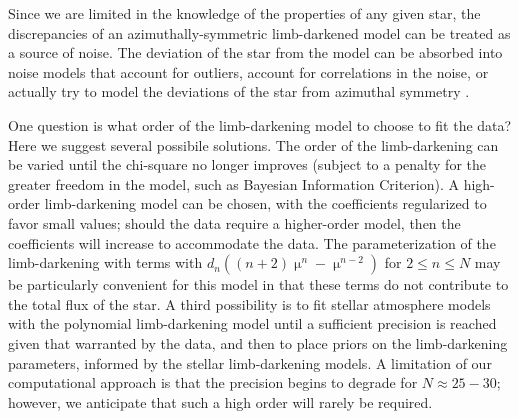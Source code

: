 \documentclass[modern]{aastex61}
\begin{document}
Since we are limited in the knowledge of the properties of any given star,
the discrepancies of an azimuthally-symmetric limb-darkened model can be
treated as a source of noise.
The deviation of the star from the model can be absorbed into noise models that
account for outliers, account for correlations in the noise, or actually
try to model the deviations of the star from azimuthal symmetry
\citep[e.g.][]{SanchisOjeda2011}.


One question is what order of the limb-darkening model to choose to
fit the data?  Here we suggest several possibile solutions.  The order of the
limb-darkening can be varied until the chi-square no longer improves (subject
to a penalty for the greater freedom in the model, such as Bayesian Information
Criterion).  A high-order limb-darkening model can be chosen, with the
coefficients regularized to favor small values;  should the data require
a higher-order model, then the coefficients will increase to accommodate
the data.  The parameterization of the limb-darkening with terms with
$d_n ((n+2)\upmu^n-\upmu^{n-2})$ for $2 \le n \le N$ may be particularly
convenient for this model in that these terms do not contribute to the
total flux of the star.  A third possibility is to fit stellar atmosphere
models with the polynomial limb-darkening model until a sufficient precision
is reached given that warranted by the data, and then to place priors
on the limb-darkening parameters, informed by the stellar limb-darkening
models.  A limitation of our computational approach is that the precision
begins to degrade for $N \approx 25-30$; however, we anticipate that such
a high order will rarely be required.
\end{document}
